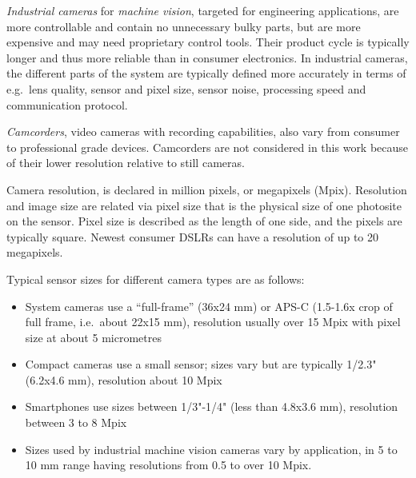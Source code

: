 \emph{Industrial cameras} for \emph{machine vision}, targeted for engineering applications, are more controllable and contain no unnecessary bulky parts, but are more expensive and may need proprietary control tools.
Their product cycle is typically longer and thus more reliable than in consumer electronics.
In industrial cameras, the different parts of the system are typically defined more accurately in terms of e.g.\ lens quality, sensor and pixel size, sensor noise, processing speed and communication protocol.

\emph{Camcorders}, video cameras with recording capabilities, also vary from consumer to professional grade devices.
Camcorders are not considered in this work because of their lower resolution relative to still cameras.


Camera resolution, is declared in million pixels, or megapixels (Mpix).
Resolution and image size are related via pixel size that is the physical size of one photosite on the sensor.
Pixel size is described as the length of one side, and the pixels are typically square.
Newest consumer DSLRs can have a resolution of up to 20 megapixels.


Typical sensor sizes for different camera types are as follows:

\begin{itemize}
	\item System cameras use a ``full-frame'' (36x24 mm) or APS-C (1.5-1.6x crop of full frame, i.e.~about 22x15 mm), resolution usually over 15 Mpix with pixel size at about 5 micrometres
	\item Compact cameras use a small sensor; sizes vary but are typically 1/2.3" (6.2x4.6 mm), resolution about 10 Mpix
	\item Smartphones use sizes between 1/3"-1/4" (less than 4.8x3.6 mm), resolution between 3 to 8 Mpix
	\item Sizes used by industrial machine vision cameras vary by application, in 5 to 10 mm range having resolutions from 0.5 to over 10 Mpix.
\end{itemize}




